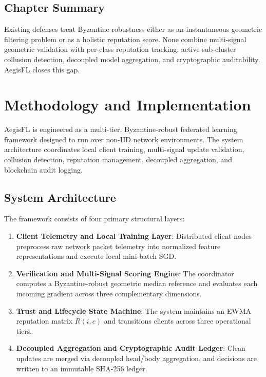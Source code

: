 \documentclass[12pt,a4paper]{report}
\begin{document}
\section{Chapter Summary}
Existing defenses treat Byzantine robustness either as an instantaneous geometric filtering problem or as a holistic reputation score. None combine multi-signal geometric validation with per-class reputation tracking, active sub-cluster collusion detection, decoupled model aggregation, and cryptographic auditability. AegisFL closes this gap.

\newpage
\chapter{Methodology and Implementation}

AegisFL is engineered as a multi-tier, Byzantine-robust federated learning framework designed to run over non-IID network environments. The system architecture coordinates local client training, multi-signal update validation, collusion detection, reputation management, decoupled aggregation, and blockchain audit logging.

\section{System Architecture}
The framework consists of four primary structural layers:
\begin{enumerate}
    \item \textbf{Client Telemetry and Local Training Layer}: Distributed client nodes preprocess raw network packet telemetry into normalized feature representations and execute local mini-batch SGD.
    \item \textbf{Verification and Multi-Signal Scoring Engine}: The coordinator computes a Byzantine-robust geometric median reference and evaluates each incoming gradient across three complementary dimensions.
    \item \textbf{Trust and Lifecycle State Machine}: The system maintains an EWMA reputation matrix $R(i, c)$ and transitions clients across three operational tiers.
    \item \textbf{Decoupled Aggregation and Cryptographic Audit Ledger}: Clean updates are merged via decoupled head/body aggregation, and decisions are written to an immutable SHA-256 ledger.
\end{enumerate}
\end{document}
